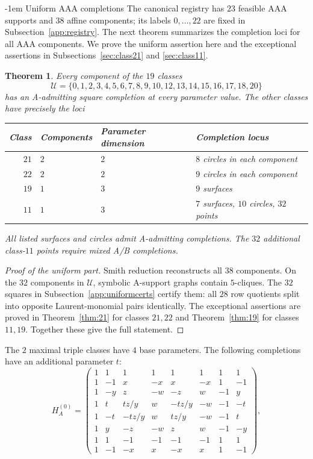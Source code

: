 \documentclass[11pt,a4paper]{article}
\makeatletter
\newtheorem{theorem}{Theorem}[section]
\theoremstyle{plain}
\theoremstyle{definition}
\numberwithin{equation}{section}
\renewcommand\subsection{\@startsection{subsection}{2}{\z@}  {\medskipamount}  {-1em}  {\normalfont\normalsize\bfseries}}
\makeatother
\begin{document}
\subsection{Uniform AAA completions}\label{sec:aaa}
The canonical registry has $23$ feasible AAA supports and $38$ affine components; its labels $0,\ldots,22$ are fixed in Subsection~\ref{app:registry}.
The next theorem summarizes the completion loci for all AAA components. We prove the uniform assertion here and the exceptional assertions in Subsections~\ref{sec:class21} and \ref{sec:class11}.
\begin{theorem}\label{thm:AAAexistence}\label{thm:summary}
Every component of the $19$ classes
$$\mathcal U=\{0,1,2,3,4,5,6,7,8,9,10,12,13,14,15,16,17,18,20\}$$
has an A-admitting square completion at every parameter value. The other classes have precisely the loci
\begin{center}\begin{tabular}{rlll}\toprule
Class&Components&Parameter dimension&Completion locus\\\midrule
$21$&$2$&$2$&$8$ circles in each component\\
$22$&$2$&$2$&$9$ circles in each component\\
$19$&$1$&$3$&$9$ surfaces\\
$11$&$1$&$3$&$7$ surfaces, $10$ circles, $32$ points\\\bottomrule
\end{tabular}\end{center}
All listed surfaces and circles admit A-admitting completions. The $32$ additional class-$11$ points require mixed A/B completions.
\end{theorem}
\begin{proof}[Proof of the uniform part]
Smith reduction reconstructs all $38$ components. On the $32$ components in $\mathcal U$, symbolic A-support graphs contain $5$-cliques. The $32$ squares in Subsection~\ref{app:uniformcerts} certify them: all $28$ row quotients split into opposite Laurent-monomial pairs identically. The exceptional assertions are proved in Theorem~\ref{thm:21} for classes $21,22$ and Theorem~\ref{thm:19} for classes $11,19$. Together these give the full statement.
\end{proof}
The $2$ maximal triple classes have $4$ base parameters. The following completions have an additional parameter $t$:
\begin{equation}\label{eq:HA0}
H_A^{(0)}=
\begin{pmatrix}
1&1&1&1&1&1&1&1\\
1&-1&x&-x&x&-x&1&-1\\
1&-y&z&-w&-z&w&-1&y\\
1&t&tz/y&w&-tz/y&-w&-1&-t\\
1&-t&-tz/y&w&tz/y&-w&-1&t\\
1&y&-z&-w&z&w&-1&-y\\
1&1&-1&-1&-1&-1&1&1\\
1&-1&-x&x&-x&x&1&-1
\end{pmatrix},
\end{equation}
\end{document}
